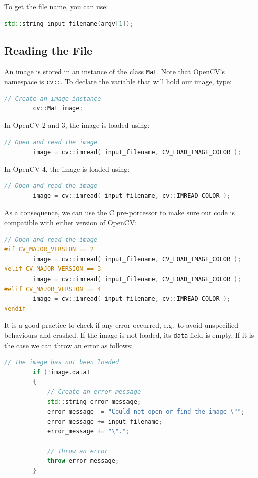 \documentclass[english,a4paper,12pt,oneside]{article}
\begin{document}
To get the file name, you can use:
\begin{lstlisting}[language=c++,caption=Getting the file name from the command line arguments.]
std::string input_filename(argv[1]);
\end{lstlisting}

\subsection{Reading the File}

An image is stored in an instance of the class  \verb+Mat+. 
Note that OpenCV's namespace is \verb+cv::+. 
To declare the variable that will hold our image, type:
 \begin{lstlisting}[language=c++]
        // Create an image instance
        cv::Mat image;
\end{lstlisting}

In OpenCV 2 and 3, the image is loaded using:
 \begin{lstlisting}[language=c++,caption=Open an image with OpenCV2 and 3.]
        // Open and read the image
        image = cv::imread( input_filename, CV_LOAD_IMAGE_COLOR );
\end{lstlisting}

In OpenCV 4, the image is loaded using:
 \begin{lstlisting}[language=c++,caption=Open an image with OpenCV4.]
        // Open and read the image
        image = cv::imread( input_filename, cv::IMREAD_COLOR );
\end{lstlisting}

As a consequence, we can use the C pre-porcessor to make sure our code is compatible with either version of OpenCV:
 \begin{lstlisting}[language=c++,caption=Open an image with any version of OpenCV.]
        // Open and read the image
#if CV_MAJOR_VERSION == 2
        image = cv::imread( input_filename, CV_LOAD_IMAGE_COLOR );
#elif CV_MAJOR_VERSION == 3
        image = cv::imread( input_filename, CV_LOAD_IMAGE_COLOR );
#elif CV_MAJOR_VERSION == 4
        image = cv::imread( input_filename, cv::IMREAD_COLOR );
#endif
\end{lstlisting}

It is a good practice to check if any error occurred, e.g.~to avoid unspecified behaviours and crashed. 
If the image is not loaded, its \verb+data+ field is empty. 
If it is the case we can throw an error as follows:
 \begin{lstlisting}[language=c++,caption=Check that the image contains data]
        // The image has not been loaded
        if (!image.data)
        {
            // Create an error message
            std::string error_message;
            error_message  = "Could not open or find the image \"";
            error_message += input_filename;
            error_message += "\".";

            // Throw an error
            throw error_message;
        }
\end{lstlisting}
\end{document}

